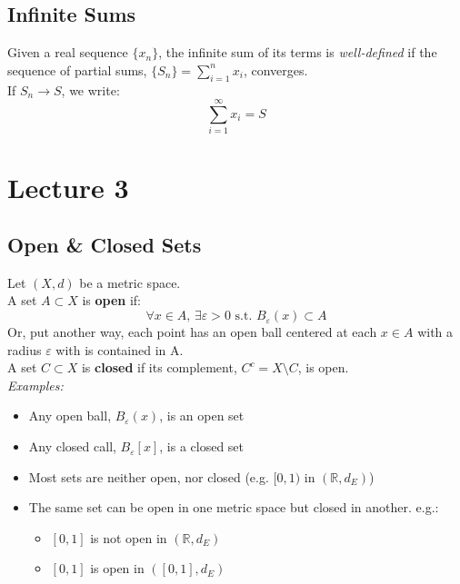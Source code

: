 \documentclass{article}
\newcommand{\R}{\mathbb{R}}
\begin{document}
\subsection{Infinite Sums}
Given a real sequence $\{x_n\}$, the infinite sum of its terms is \textit{well-defined} if the sequence of partial sums, $\{S_n\}=\sum_{i=1}^n x_i$, converges.
\smallskip \\
If $S_n\rightarrow S$, we write:
\[
	\sum_{i=1}^\infty x_i=S
\]


\section{Lecture 3}

\subsection{Open \& Closed Sets}
Let $(X,d)$ be a metric space.
\smallskip\\
A set $A\subset X$ is \textbf{open} if:
\[
	\forall x\in A\text{, }\exists\varepsilon>0\text{ s.t. }B_\varepsilon(x)\subset A
\]
Or, put another way, each point has an open ball centered at each $x\in A$ with a radius $\varepsilon$ with is contained in A.
\medskip \\
A set $C\subset X$ is \textbf{closed} if its complement, $C^c=X\setminus C$, is open.
\bigskip \\
\textit{Examples:}
\begin{itemize}
	\item Any open ball, $B_\varepsilon(x)$, is an open set 
	\item Any closed call, $B_\varepsilon[x]$, is a closed set 
	\item Most sets are neither open, nor closed (e.g. $[0,1)$ in $(\R,d_E)$)
	\item The same set can be open in one metric space but closed in another. e.g.:
	\begin{itemize}
		\item $[0,1]$ is not open in $(\R,d_E)$
		\item $[0,1]$ is open in $([0,1],d_E)$
	\end{itemize}
\end{itemize}
\end{document}
